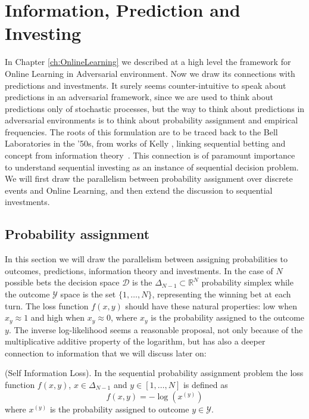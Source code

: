 \chapter{Information, Prediction and Investing}

In Chapter \ref{ch:OnlineLearning} we described at a high level the framework for Online Learning in Adversarial environment. Now we draw its connections with predictions and investments. It surely seems counter-intuitive to speak about predictions in an adversarial framework, since we are used to think about predictions only of stochastic processes, but the way to think about predictions in adversarial environments is to think about probability assignment and empirical frequencies. The roots of this formulation are to be traced back to the Bell Laboratories in the '50s, from works of Kelly \cite{kelly2011new}, linking sequential betting and concept from information theory~\cite{cover2012elements}. This connection is of paramount importance to understand sequential investing as an instance of sequential decision problem.
We will first draw the parallelism between probability assignment over discrete events and Online Learning, and then extend the discussion to sequential investments.

\section{Probability assignment}
In this section we will draw the parallelism between assigning probabilities to outcomes, predictions, information theory and investments.  
In the case of $N$ possible bets the decision space $\mathcal D$ is the $\Delta_{N-1}\subset \mathbb R^{N}$ probability simplex while the outcome $\mathcal Y$ space is the set $\{1,\ldots,N\}$, representing the winning bet at each turn. The loss function $f(x,y)$ should have these natural properties: low when $x_y\approx1$ and high when $x_y\approx0$, where $x_y$ is the probability assigned to the outcome $y$. The inverse log-likelihood seems a reasonable proposal, not only because of the multiplicative additive property of the logarithm, but has also a deeper connection to information that we will discuss later on:

\begin{definition}(Self Information Loss).\label{def:log_loss}
    In the sequential probability assignment problem the loss function $f(x,y)$, $x\in \Delta_{N-1}$ and $y\in[1,\ldots,N]$ is defined as
    $$f(x,y)=-\log\left(x^{(y)}\right)$$
where $x^{(y)}$ is the probability assigned to outcome $y\in\mathcal Y$.
\end{definition}

